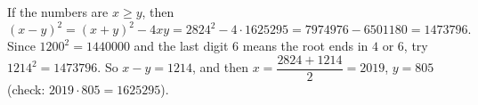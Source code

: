 If the numbers are $x\ge y$, then
\[(x-y)^2=(x+y)^2-4xy=2824^2-4\cdot1625295=7974976-6501180=1473796.\]
Since $1200^2=1440000$ and the last digit $6$ means the root ends in $4$ or $6$, try $1214^2=1473796$. So $x-y=\boxed{1214}$, and then $x=\dfrac{2824+1214}{2}=2019$, $y=805$ (check: $2019\cdot805=1625295$).
